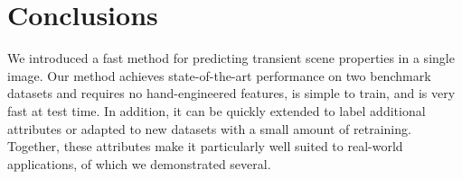 \documentclass[10pt,twocolumn,letterpaper]{article}
\begin{document}
\section{Conclusions}

We introduced a fast method for predicting transient scene properties
in a single image. Our method achieves state-of-the-art performance on
two benchmark datasets and requires no hand-engineered features, is
simple to train, and is very fast at test time. In addition, it can be
quickly extended to label additional attributes or adapted to new
datasets with a small amount of retraining. Together, these attributes
make it particularly well suited to real-world applications, of which
we demonstrated several.


%

{\small


}
\end{document}
